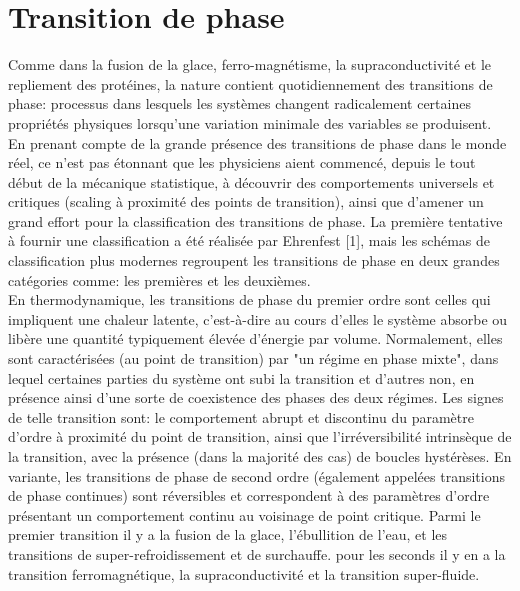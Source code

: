 \section{Transition de phase}
Comme dans la fusion de la glace, ferro-magnétisme, la supraconductivité et le repliement des protéines, la nature contient quotidiennement des transitions de phase: processus dans lesquels les systèmes changent radicalement certaines propriétés physiques lorsqu'une variation minimale des variables se produisent.\\
En prenant compte de la grande présence des transitions de phase dans le monde réel, ce n'est pas étonnant que les physiciens aient commencé, depuis le tout début de la mécanique statistique, à découvrir des comportements universels et critiques (scaling à proximité des points de transition), ainsi que d'amener un grand effort pour la classification des transitions de phase. La première tentative à fournir une classification a été réalisée par Ehrenfest [1], mais les schémas de classification plus modernes regroupent les transitions de phase en deux grandes catégories comme: les premières et les deuxièmes.\\
En thermodynamique, les transitions de phase du premier ordre sont celles qui impliquent une chaleur latente, c'est-à-dire au cours d'elles le système absorbe ou libère une quantité typiquement élevée d'énergie par volume. Normalement, elles sont caractérisées (au point de transition) par "un régime en phase mixte", dans lequel certaines parties du système ont subi la transition et d'autres non, en présence ainsi d'une sorte de coexistence des phases des deux régimes. Les signes de telle transition sont: le comportement abrupt et discontinu du paramètre d'ordre à proximité du point de transition, ainsi que l'irréversibilité intrinsèque de la transition, avec la présence (dans la majorité des cas) de boucles hystérèses. En variante, les transitions de phase de second ordre (également appelées transitions de phase continues) sont réversibles et correspondent à des paramètres d'ordre présentant un comportement continu au voisinage de point critique.
Parmi le premier transition il y a la fusion de la glace, l'ébullition de l'eau, et les transitions de super-refroidissement et de surchauffe. pour les seconds il y en a la transition ferromagnétique, la supraconductivité et la transition super-fluide.
